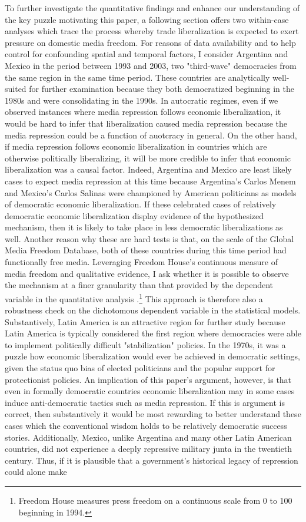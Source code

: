 \documentclass[12pt,a4paper]{article}\usepackage[]{graphicx}\usepackage[]{color}
\begin{document}
To further investigate the quantitative findings and enhance our understanding of the key puzzle motivating this paper, a following section offers two within-case analyses which trace the process whereby trade liberalization is expected to exert pressure on domestic media freedom. For reasons of data availability and to help control for confounding spatial and temporal factors, I consider Argentina and Mexico in the period between 1993 and 2003, two "third-wave" democracies from the same region in the same time period. These countries are analytically well-suited for further examination because they both democratized beginning in the 1980s and were consolidating in the 1990s. In autocratic regimes, even if we observed instances where media repression follows economic liberalization, it would be hard to infer that liberalization caused media repression because the media repression could be a function of auotcracy in general. On the other hand, if media repression follows economic liberalization in countries which are otherwise politically liberalizing, it will be more credible to infer that economic liberalization was a causal factor. Indeed, Argentina and Mexico are least likely cases to expect media repression at this time because Argentina's Carlos Menem and Mexico's Carlos Salinas were championed by American politicians as models of democratic economic liberalization. If these celebrated cases of relatively democratic economic liberalization display evidence of the hypothesized mechanism, then it is likely to take place in less democratic liberalizations as well. Another reason why these are hard tests is that, on the scale of the Global Media Freedom Database, both of these countries during this time period had functionally free media. Leveraging Freedom House's continuous measure of media freedom and qualitative evidence, I ask whether it is possible to observe the mechanism at a finer granularity than that provided by the dependent variable in the quantitative analysis \parencite{FreedomHouse:2011vv}.\footnote{Freedom House measures press freedom on a continuous scale from 0 to 100 beginning in 1994.} This approach is therefore also a robustness check on the dichotomous dependent variable in the statistical models. Substantively, Latin America is an attractive region for further study because Latin America is typically considered the first region where democracies were able to implement politically difficult "stabilization" policies. In the 1970s, it was a puzzle how economic liberalization would ever be achieved in democratic settings, given the status quo bias of elected politicians and the popular support for protectionist policies. An implication of this paper's argument, however, is that even in formally democratic countries economic liberalization may in some cases induce anti-democratic tactics such as media repression. If this is argument is correct, then substantively it would be most rewarding to better understand these cases which the conventional wisdom holds to be relatively democratic success stories. Additionally, Mexico, unlike Argentina and many other Latin American countries, did not experience a deeply repressive military junta in the twentieth century. Thus, if it is plausible that a government's historical legacy of repression could alone make 
\end{document}
